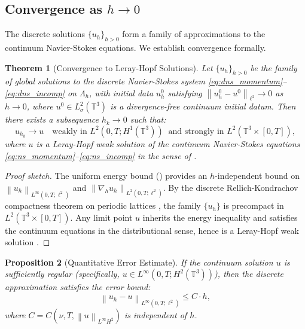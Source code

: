 \documentclass[12pt, a4paper]{article}
\theoremstyle{plain}
\newtheorem{theorem}{Theorem}[section]
\newtheorem{proposition}[theorem]{Proposition}
\theoremstyle{definition}
\theoremstyle{remark}
\newcommand{\T}{\mathbb{T}}
\newcommand{\norm}[1]{\left\| #1 \right\|}
\newcommand{\grad}{\nabla_h}
\newcommand{\uh}{u_h}
\begin{document}
\subsection{Convergence as $h \to 0$}

The discrete solutions $\{\uh\}_{h>0}$ form a family of approximations to the
continuum Navier-Stokes equations. We establish convergence formally.

\begin{theorem}[Convergence to Leray-Hopf Solutions]\label{thm:convergence}
  Let $\{u_h\}_{h>0}$ be the family of global solutions to the discrete
  Navier-Stokes system \eqref{eq:dns_momentum}--\eqref{eq:dns_incomp} on
  $\Lambda_h$, with initial data $u_h^0$ satisfying
  $\norm{u_h^0 - u^0}_{\ell^2} \to 0$ as $h \to 0$, where
  $u^0 \in L^2_\sigma(\T^3)$ is a divergence-free continuum initial datum.
  Then there exists a subsequence $h_k \to 0$ such that:
  \begin{equation}\label{eq:convergence}
    u_{h_k} \to u \quad \text{weakly in } L^2(0,T; H^1(\T^3))
    \;\; \text{and strongly in } L^2(\T^3 \times [0,T]),
  \end{equation}
  where $u$ is a Leray-Hopf weak solution of the continuum Navier-Stokes
  equations \eqref{eq:ns_momentum}--\eqref{eq:ns_incomp} in the sense
  of \citet{Leray1934}.
\end{theorem}

\begin{proof}[Proof sketch]
  The uniform energy bound () provides an
  $h$-independent bound on $\norm{u_h}_{L^\infty(0,T;\ell^2)}$ and
  $\norm{\grad u_h}_{L^2(0,T;\ell^2)}$. By the discrete Rellich-Kondrachov
  compactness theorem on periodic lattices \citep{LeVeque2007}, the family
  $\{u_h\}$ is precompact in $L^2(\T^3 \times [0,T])$. Any limit point
  $u$ inherits the energy inequality and satisfies the continuum equations
  in the distributional sense, hence is a Leray-Hopf weak solution
  \citep{Temam2001, ConstantinFoias1988}.
\end{proof}

\begin{proposition}[Quantitative Error Estimate]\label{prop:error}
  If the continuum solution $u$ is sufficiently regular (specifically,
  $u \in L^\infty(0,T; H^2(\T^3))$), then the discrete approximation
  satisfies the error bound:
  \begin{equation}\label{eq:error_rate}
    \norm{u_h - u}_{L^\infty(0,T;\ell^2)} \leq C \cdot h,
  \end{equation}
  where $C = C(\nu, T, \norm{u}_{L^\infty H^2})$ is independent of $h$.
\end{proposition}
\end{document}
